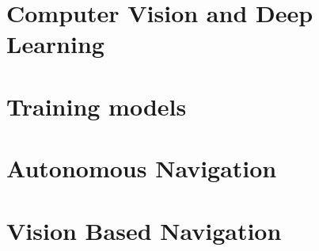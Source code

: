 \section{Computer Vision and Deep Learning}
\label{se:computervisionanddeeplearning}


\section{Training models}
\label{se:trainingmodels}


\section{Autonomous Navigation}
\label{se:autonomousnavigation}


\section{Vision Based Navigation}
\label{se:visionbasednavigation}


